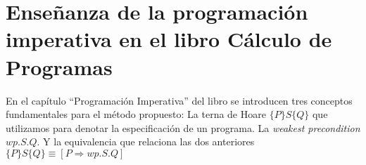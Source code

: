 \documentclass[11pt, a4paper, openany]{book}
\begin{document}
    \chapter{Enseñanza de la programación imperativa en el libro Cálculo de Programas}

    En el capítulo ``Programación Imperativa'' del libro se introducen tres conceptos fundamentales para el método propuesto: La terna de Hoare
        \begin{math}
            \{P\}S\{Q\}
        \end{math} que utilizamos para denotar la especificación de un programa. La \textit{weakest precondition}
        \begin{math}
            wp.S.Q
        \end{math}. Y la equivalencia que relaciona las dos anteriores \begin{math}
            \{P\}S\{Q\} \equiv [P \Rightarrow wp.S.Q]
        \end{math}
\end{document}
